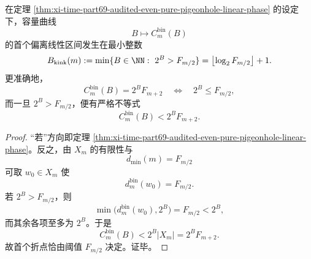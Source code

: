 \begin{corollary}\label{cor:xi-time-part69-binfold-first-kink}
在定理 \ref{thm:xi-time-part69-audited-even-pure-pigeonhole-linear-phase} 的设定下，容量曲线
\[
B\longmapsto C_m^{\mathrm{bin}}(B)
\]
的首个偏离线性区间发生在最小整数
\[
B_{\mathrm{kink}}(m):=\min\{B\in\NN:\ 2^B>F_{m/2}\}
=
\bigl\lfloor \log_2 F_{m/2}\bigr\rfloor+1.
\]
更准确地，
\[
C_m^{\mathrm{bin}}(B)=2^BF_{m+2}
\quad\Longleftrightarrow\quad
2^B\le F_{m/2},
\]
而一旦 \(2^B>F_{m/2}\)，便有严格不等式
\[
C_m^{\mathrm{bin}}(B)<2^BF_{m+2}.
\]
\end{corollary}
\begin{proof}
“若”方向即定理 \ref{thm:xi-time-part69-audited-even-pure-pigeonhole-linear-phase}。反之，由 \(X_m\) 的有限性与
\[
d_{\min}(m)=F_{m/2}
\]
可取 \(w_0\in X_m\) 使
\[
d_m^{\mathrm{bin}}(w_0)=F_{m/2}.
\]
若 \(2^B>F_{m/2}\)，则
\[
\min\bigl(d_m^{\mathrm{bin}}(w_0),2^B\bigr)=F_{m/2}<2^B,
\]
而其余各项至多为 \(2^B\)。于是
\[
C_m^{\mathrm{bin}}(B)<2^B|X_m|=2^BF_{m+2}.
\]
故首个折点恰由阈值 \(F_{m/2}\) 决定。证毕。
\end{proof}

